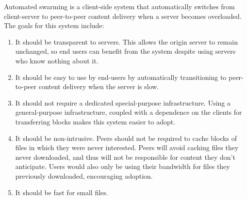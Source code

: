 Automated swarming is a client-side system that automatically switches from client-server to peer-to-peer content delivery when a server becomes overloaded.  The goals for this system include:
\begin{enumerate}
\item It should be transparent to servers.  This allows the origin server to remain unchanged, so end users can benefit from the system despite using servers who know nothing about it.
\item It should be easy to use by end-users by automatically transitioning to peer-to-peer content delivery when the server is slow.
\item It should not require a dedicated special-purpose infrastructure.  Using a general-purpose infrastructure, coupled with a dependence on the clients for transferring blocks 
makes this system easier to adopt.
\item It should be non-intrusive.  Peers should not be required to cache blocks of files in which they were never interested.  
Peers will avoid caching files they never downloaded, and thus will not be responsible for content they don't anticipate.  
Users would also only be using their bandwidth for files they previously downloaded, encouraging adoption.
\item It should be fast for small files.
\end{enumerate}

